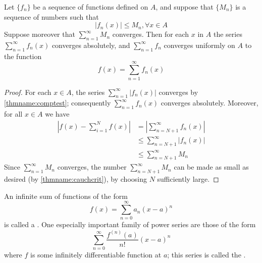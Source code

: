 \documentclass[12pt, a4paper, oneside, openright, titlepage]{book}
\begin{document}
\begin{namthm}\label{thmname:mtest}
    Let $\{f_n\}$ be a sequence of functions defined on $A$, and suppose that $\{M_n\}$ is a sequence of numbers such that \begin{equation*}
        |f_n(x)|\leq M_n,\forall x \in A
    \end{equation*}
    Suppose moreover that $\sum\limits_{n=1}^{\infty}M_n$ converges. Then for each $x$ in $A$ the series $\sum\limits_{n=1}^{\infty}f_n(x)$ converges absolutely, and $\sum\limits_{n=1}^{\infty}f_n$ converges uniformly on $A$ to the function \begin{equation*}
        f(x) = \sum\limits_{n=1}^{\infty}f_n(x)
    \end{equation*}
\end{namthm}
\begin{proof}
    For each $x \in A$, the series $\sum\limits_{n=1}^{\infty}|f_n(x)|$ converges by \ref{thmname:comptest}; consequently $\sum\limits_{n=1}^{\infty}f_n(x)$ converges absolutely. Moreover, for all $x \in A$ we have \begin{align*}
        \left|f(x) - \sum\limits_{i=1}^{N}f(x)\right| &= \left|\sum\limits_{n=N+1}^{\infty}f_n(x)\right| \\
        &\leq \sum\limits_{n=N+1}^{\infty}|f_n(x)| \\
        &\leq \sum\limits_{n=N+1}^{\infty}M_n
    \end{align*}
    Since $\sum\limits_{n=1}^{\infty}M_n$ converges, the number $\sum\limits_{n=N+1}^{\infty}M_n$ can be made as small as desired (by \ref{thmname:cauchcrit}), by choosing $N$ sufficiently large.
\end{proof}




\begin{defn}
    An infinite sum of functions of the form \begin{equation*}
        f(x) = \sum\limits_{n=0}^{\infty}a_n(x-a)^n
    \end{equation*}
    is called a . One especially important family of power series are those of the form \begin{equation*}
        \sum\limits_{n=0}^{\infty}\frac{f^{(n)}(a)}{n!}(x-a)^n
    \end{equation*}
    where $f$ is some infinitely differentiable function at $a$; this series is called the .
\end{defn}
\end{document}
